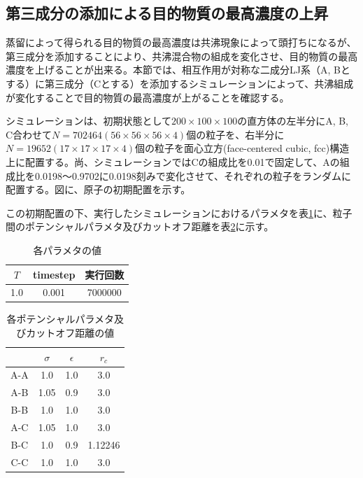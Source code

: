 \documentclass[titlepage]{jsreport}
\begin{document}
\subsection{第三成分の添加による目的物質の最高濃度の上昇} \label{method-subsec:bi-component-addition-of-3rd-component-highest-purity}
蒸留によって得られる目的物質の最高濃度は共沸現象によって頭打ちになるが、第三成分を添加することにより、共沸混合物の組成を変化させ、目的物質の最高濃度を上げることが出来る\cite{azeotrope-add_third_component}。本節では、相互作用が対称な二成分LJ系（A, Bとする）に第三成分（Cとする）を添加するシミュレーションによって、共沸組成が変化することで目的物質の最高濃度が上がることを確認する。

シミュレーションは、初期状態として$200×100×100$の直方体の左半分にA, B, C合わせて$N=702464(56×56×56×4)$個の粒子を、右半分に$N=19652(17×17×17×4)$個の粒子を面心立方(face-centered cubic, fcc)構造上に配置する。尚、シミュレーションではCの組成比を0.01で固定して、Aの組成比を0.0198〜0.9702に0.0198刻みで変化させて、それぞれの粒子をランダムに配置する。図に、原子の初期配置を示す。

この初期配置の下、実行したシミュレーションにおけるパラメタを表\ref{table:bi-component-addition-of-3rd-component-parameter}に、粒子間のポテンシャルパラメタ及びカットオフ距離を表\ref{table:bi-component-addition-of-3rd-component-potential-parameter}に示す。

\begin{table}[htbp]
    \begin{center}
        \caption{各パラメタの値}
        \label{table:bi-component-addition-of-3rd-component-parameter}
        \begin{tabular}{c c c}
            $T$ & timestep & 実行回数 \\
            \hline
            1.0 & 0.001 & 7000000 \\
        \end{tabular}
    \end{center}
\end{table}

\begin{table}[htbp]
    \begin{center}
        \caption{各ポテンシャルパラメタ及びカットオフ距離の値}
        \label{table:bi-component-addition-of-3rd-component-potential-parameter}
        \begin{tabular}{c c c c}
            & $\sigma$ & $\epsilon$ & $r_c$ \\
            \hline
            A-A & 1.0 & 1.0 & 3.0 \\
            A-B & 1.05 & 0.9 & 3.0 \\
            B-B & 1.0 & 1.0 & 3.0 \\
            A-C & 1.05 & 1.0 & 3.0 \\
            B-C & 1.0 & 0.9 & 1.12246 \\
            C-C & 1.0 & 1.0 & 3.0
        \end{tabular}
    \end{center}
\end{table}
\end{document}
